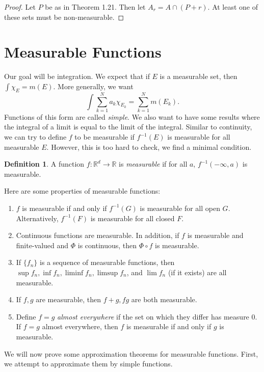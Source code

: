 \documentclass[leqno, openany]{memoir}
\theoremstyle{definition}
\newtheorem{defn}[thm]{Definition}
\theoremstyle{remark}
\theoremstyle{plain}
\theoremstyle{definition}
\theoremstyle{remark}
\newcommand{\R}{\mathbb{R}}
\begin{document}
\begin{proof} Let $P$ be as in Theorem 1.21. Then let $A_r = A \cap (P+r)$. At
least one of these sets must be non-measurable.  \end{proof}

\section{Measurable Functions}%

Our goal will be integration. We expect that if $E$ is a measurable set, then
$\int \chi_E = m(E)$. More generally, we want \[ \int \sum_{k=1}^N a_k
\chi_{E_k} = \sum_{k=1}^N m(E_k). \] Functions of this form are called
\textit{simple}. We also want to have some results where the integral of a
limit is equal to the limit of the integral. Similar to continuity, we can try
to define $f$ to be measurable if $f^{-1}(E)$ is measurable for all measurable
$E$. However, this is too hard to check, we find a minimal condition.

\begin{defn} A function $f: \R^d \to \R$ is \textit{measurable} if for all $a$,
$f^{-1}(-\infty, a)$ is measurable.  \end{defn}

Here are some properties of measurable functions: \begin{enumerate} \item $f$
    is measurable if and only if $f^{-1}(G)$ is measurable for all open $G$.
    Alternatively, $f^{-1}(F)$ is measurable for all closed $F$.  \item
    Continuous functions are measurable. In addition, if $f$ is measurable and
    finite-valued and $\Phi$ is continuous, then $\Phi \circ f$ is measurable.
\item If $\{f_n \}$ is a sequence of measurable functions, then $\sup f_n, \inf
    f_n, \liminf f_n, \limsup f_n$, and $\lim f_n$ (if it exists) are all
    measurable.  \item If $f,g$ are measurable, then $f+g, fg$ are both
    measurable.  \item Define $f=g$ \textit{almost everywhere} if the set on
    which they differ has measure $0$. If $f=g$ almost everywhere, then $f$ is
    measurable if and only if $g$ is measurable.  \end{enumerate}

We will now prove some approximation theorems for measurable functions. First,
we attempt to approximate them by simple functions.
\end{document}
